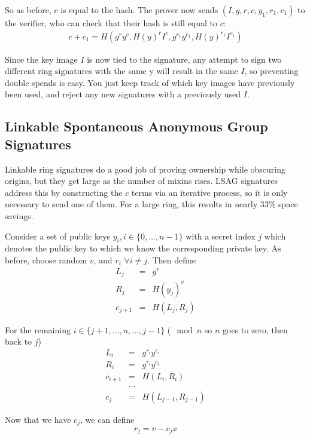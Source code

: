 \documentclass{article}
\begin{document}
So as before, $c$ is equal to the hash.  The prover now sends $(I, y, r, c, y_1, r_1, c_1)$ to the verifier, who can check that their hash is still equal to $c$:
\begin{eqnarray}
  c + c_1 = H(g^r y^c, H(y)^r I^c, g^{r_1} y^{c_1}, H(y)^{r_1} I^{c_1})
\end{eqnarray}

Since the key image $I$ is now tied to the signature, any attempt to sign two different ring signatures with the same y will result in the same $I$, so preventing double spends is easy.  You just keep track of which key images have previously been used, and reject any new signatures with a previously used $I$.


\subsection{Linkable Spontaneous Anonymous Group Signatures}

Linkable ring signatures do a good job of proving ownership while obscuring origins, but they get large as the number of mixins rises. LSAG signatures address this by constructing the $c$ terms via an iterative process, so it is only necessary to send one of them.  For a large ring, this results in nearly 33\% space savings.

Consider a set of public keys $y_i, i \in \{0, …, n-1\}$ with a secret index $j$ which denotes the public key to which we know the corresponding private key.  As before, choose random $v$, and $r_i$ $\forall i \ne j$.  Then define
\begin{eqnarray}
      L_j &=& g^v\\
      R_j &=& H(y_j)^v\\
  c_{j+1} &=& H(L_j,R_j)
\end{eqnarray}

For the remaining $i \in \{j+1, …, n, …, j-1\}$ ($\mod{n}$ so $n$ goes to zero, then back to $j$)
\begin{eqnarray}
  L_i &=& g^{r_i} y^{c_i}\\
  R_i &=& g^{r_i} y^{c_i}\\
  c_{i+1} &=& H(L_i,R_i)\\
  &...& \\
  c_j &=& H(L_{j-1}, R_{j-1})
\end{eqnarray}

Now that we have $c_j$, we can define
\begin{eqnarray}
  r_j = v - c_j x
\end{eqnarray}
\end{document}
